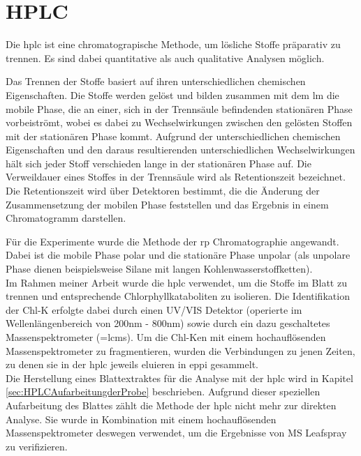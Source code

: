 \section{HPLC}

Die \gls{hplc} ist eine chromatograpische Methode, um lösliche Stoffe präparativ zu trennen. Es sind dabei quantitative als auch qualitative Analysen möglich. \cite[S. 165]{Chromatographie} 

Das Trennen der Stoffe basiert auf ihren unterschiedlichen chemischen Eigenschaften. Die Stoffe werden gelöst und bilden zusammen mit dem \gls{lm} die mobile Phase, die an einer, sich in der Trennsäule befindenden stationären Phase vorbeiströmt, wobei es dabei zu Wechselwirkungen zwischen den gelösten Stoffen mit der stationären Phase kommt. Aufgrund der unterschiedlichen chemischen Eigenschaften und den daraus resultierenden unterschiedlichen Wechselwirkungen hält sich jeder Stoff verschieden lange in der stationären Phase auf. Die Verweildauer eines Stoffes in der Trennsäule wird als Retentionszeit bezeichnet. \cite[S. 31-32]{Chromatographie} Die Retentionszeit wird über Detektoren bestimmt, die die Änderung der Zusammensetzung der mobilen Phase feststellen und das Ergebnis in einem Chromatogramm darstellen. \cite[S. 46]{Chromatographie} 

Für die Experimente wurde die Methode der \gls{rp} Chromatographie angewandt. Dabei ist die mobile Phase polar und die stationäre Phase unpolar (als unpolare Phase dienen beispielsweise Silane mit langen Kohlenwasserstoffketten). \cite[S. 189]{Chromatographie}\\

Im Rahmen meiner Arbeit wurde die \gls{hplc} verwendet, um die Stoffe im Blatt zu trennen und entsprechende Chlorphyllkataboliten zu isolieren. Die Identifikation der \gls{Chl-K} erfolgte dabei durch einen UV/VIS Detektor (operierte im Wellenlängenbereich von 200nm - 800nm) sowie durch ein dazu geschaltetes Massenspektrometer (=\gls{lcms}). Um die \gls{Chl-K}en mit einem hochauflösenden Massenspektrometer zu fragmentieren, wurden die Verbindungen zu jenen Zeiten, zu denen sie in der \gls{hplc} jeweils eluieren in \gls{eppi} gesammelt.\\

Die Herstellung eines Blattextraktes für die Analyse mit der \gls{hplc} wird in Kapitel \ref{sec:HPLCAufarbeitungderProbe} beschrieben. Aufgrund dieser speziellen Aufarbeitung des Blattes zählt die Methode der \gls{hplc} nicht mehr zur direkten Analyse. Sie wurde in Kombination mit einem hochauflösenden Massenspektrometer deswegen verwendet, um die Ergebnisse von MS Leafspray zu verifizieren.

